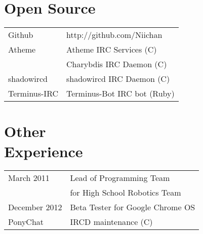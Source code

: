 \documentclass[line, margin, 12pt]{res}
\begin{document}
\begin{resume}
\section{Open Source}
\begin{tabular}{l l}
Github & http://github.com/Niichan \\ [5pt]
Atheme & Atheme IRC Services (C) \\ [5pt]
& Charybdis IRC Daemon (C) \\ [5pt]
shadowircd & shadowircd IRC Daemon (C) \\ [5pt]
Terminus-IRC & Terminus-Bot IRC bot (Ruby) \\ [5pt]
\end{tabular}
     
\section{Other \\ Experience}
\begin{tabular}{l l}
March 2011 & Lead of Programming Team \\ [5pt]
 & for High School Robotics Team \\ [5pt]
December 2012 & Beta Tester for Google Chrome OS \\ [5pt]
PonyChat & IRCD maintenance (C) \\ [5pt]
\end{tabular}
     
\end{resume}
\end{document}
